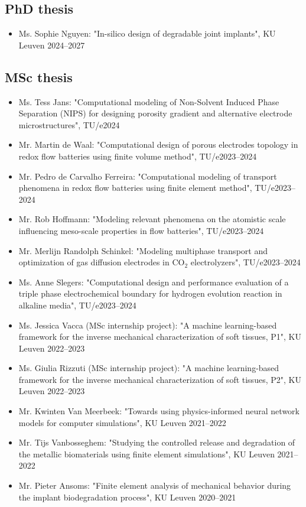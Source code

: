 \documentclass{cv}
\begin{document}
\subsection{PhD thesis}

\begin{itemize}[itemsep=-0.2ex]
\item
Ms. Sophie Nguyen: "In-silico design of degradable joint implants", KU Leuven \hfill 2024--2027
\end{itemize}

\subsection{MSc thesis}

\begin{itemize}[itemsep=-0.2ex]
\item
Ms. Tess Jans: "Computational modeling of Non-Solvent Induced Phase Separation (NIPS) for designing porosity gradient and alternative electrode microstructures", TU/e\hfill 2024
\item
Mr. Martin de Waal: "Computational design of porous electrodes topology in redox flow batteries using finite volume method", TU/e\hfill 2023--2024
\item
Mr. Pedro de Carvalho Ferreira: "Computational modeling of transport phenomena in redox flow batteries using finite element method", TU/e\hfill 2023--2024
\item
Mr. Rob Hoffmann: "Modeling relevant phenomena on the atomistic scale influencing meso-scale properties in flow batteries", TU/e\hfill 2023--2024
\item
Mr. Merlijn Randolph Schinkel: "Modeling multiphase transport and optimization of gas diffusion electrodes in $\textrm{CO}_2$ electrolyzers", TU/e\hfill 2023--2024
\item
Ms. Anne Slegers: "Computational design and performance evaluation of a triple phase electrochemical boundary for hydrogen evolution reaction in alkaline media", TU/e\hfill 2023--2024

\item
Ms. Jessica Vacca (MSc internship project): "A machine learning-based framework for the inverse mechanical characterization of soft tissues, P1", KU Leuven \hfill 2022--2023
\item
Ms. Giulia Rizzuti (MSc internship project): "A machine learning-based framework for the inverse mechanical characterization of soft tissues, P2", KU Leuven \hfill 2022--2023
\item 
Mr. Kwinten Van Meerbeek: "Towards using physics-informed neural network models for computer simulations", KU Leuven \hfill 2021--2022
\item 
Mr. Tijs Vanbosseghem: "Studying the controlled release and
degradation of the metallic biomaterials using finite element simulations", KU Leuven \hfill 2021--2022
\item 
Mr. Pieter Ansoms: "Finite element analysis of mechanical behavior during the implant biodegradation process", KU Leuven \hfill 2020--2021
\end{itemize}
\end{document}
